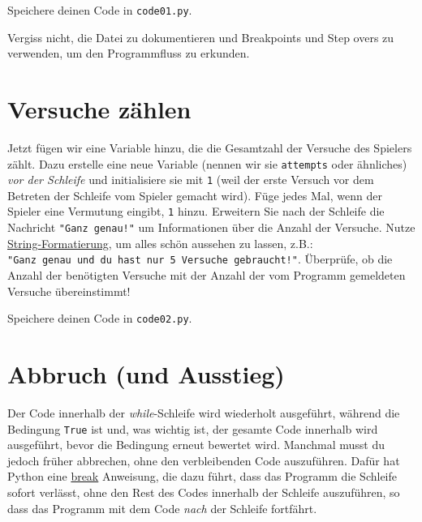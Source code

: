 \documentclass[
]{book}
\begin{document}
Speichere deinen Code in \texttt{code01.py}.

Vergiss nicht, die Datei zu dokumentieren und Breakpoints und Step overs zu verwenden, um den Programmfluss zu erkunden.

\hypertarget{versuche-zuxe4hlen}{%
\section{Versuche zählen}\label{versuche-zuxe4hlen}}

Jetzt fügen wir eine Variable hinzu, die die Gesamtzahl der Versuche des Spielers zählt. Dazu erstelle eine neue Variable (nennen wir sie \texttt{attempts} oder ähnliches) \emph{vor der Schleife} und initialisiere sie mit \texttt{1} (weil der erste Versuch vor dem Betreten der Schleife vom Spieler gemacht wird). Füge jedes Mal, wenn der Spieler eine Vermutung eingibt, \texttt{1} hinzu. Erweitern Sie nach der Schleife die Nachricht \texttt{"Ganz\ genau!"} um Informationen über die Anzahl der Versuche. Nutze \protect\hyperlink{ux5cux23string-formatting}{String-Formatierung}, um alles schön aussehen zu lassen, z.B.: \texttt{"Ganz\ genau\ und\ du\ hast\ nur\ 5\ Versuche\ gebraucht!"}. Überprüfe, ob die Anzahl der benötigten Versuche mit der Anzahl der vom Programm gemeldeten Versuche übereinstimmt!

Speichere deinen Code in \texttt{code02.py}.

\hypertarget{break}{%
\section{Abbruch (und Ausstieg)}\label{break}}

Der Code innerhalb der \emph{while}-Schleife wird wiederholt ausgeführt, während die Bedingung \texttt{True} ist und, was wichtig ist, der gesamte Code innerhalb wird ausgeführt, bevor die Bedingung erneut bewertet wird. Manchmal musst du jedoch früher abbrechen, ohne den verbleibenden Code auszuführen. Dafür hat Python eine \href{https://docs.python.org/3/tutorial/controlflow.html\#break-and-continue-statements-and-else-clauses-on-loops}{break} Anweisung, die dazu führt, dass das Programm die Schleife sofort verlässt, ohne den Rest des Codes innerhalb der Schleife auszuführen, so dass das Programm mit dem Code \emph{nach} der Schleife fortfährt.
\end{document}
